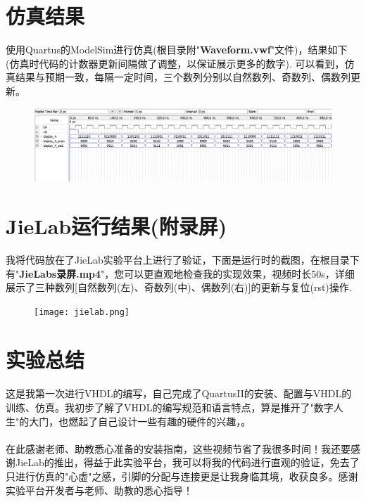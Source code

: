 \documentclass[UTF8, onecolumn, a4paper]{article}
\begin{document}
\section{仿真结果}
使用Quartus的ModelSim进行仿真(根目录附"\textbf{Waveform.vwf}"文件)，结果如下(仿真时代码的计数器更新间隔做了调整，以保证展示更多的数字).
可以看到，仿真结果与预期一致，每隔一定时间，三个数列分别以自然数列、奇数列、偶数列更新。
\begin{figure}[htb]
	\centering
	\includegraphics[width=1.0\textwidth]{simulation.png}
\end{figure}
\section{JieLab运行结果(附录屏)}
我将代码放在了JieLab实验平台上进行了验证，下面是运行时的截图，在根目录下有"\textbf{JieLabs录屏.mp4}"，您可以更直观地检查我的实现效果，视频时长50s，详细展示了三种数列[自然数列(左)、奇数列(中)、偶数列(右)]的更新与复位(rst)操作.
\begin{figure}[htb]
	\centering
	\texttt{[image: jielab.png]}
\end{figure}
\section{实验总结}
\paragraph*{}
这是我第一次进行VHDL的编写，自己完成了QuartusII的安装、配置与VHDL的训练、仿真。我初步了解了VHDL的编写规范和语言特点，算是推开了"数字人生"的大门，也燃起了自己设计一些有趣的硬件的兴趣，。
\paragraph*{}
在此感谢老师、助教悉心准备的安装指南，这些视频节省了我很多时间！我还要感谢JieLab的推出，得益于此实验平台，我可以将我的代码进行直观的验证，免去了只进行仿真的"心虚"之感，引脚的分配与连接更是让我身临其境，收获良多。感谢实验平台开发者与老师、助教的悉心指导！
\end{document}
